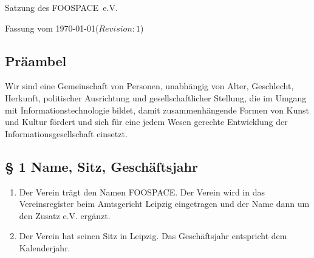 ﻿\documentclass[10pt,a4paper]{scrartcl}
\newcommand{\qs}[1]{\glqq#1\grqq}
\newcommand{\name}{FOOSPACE}
\newcommand{\revision}{$Revision: 1 $}
\begin{document}
{\LARGE Satzung des \name\ e.V.}

Fassung vom \today (\revision)

\subsection*{Präambel}



Wir sind eine Gemeinschaft von Personen, unabhängig von Alter,
Geschlecht, Herkunft, politischer Ausrichtung und gesellschaftlicher
Stellung, die im Umgang mit Informationstechnologie bildet, damit
zusammenhängende Formen von Kunst und Kultur fördert und sich für
eine jedem Wesen gerechte Entwicklung der Informationsgesellschaft
einsetzt.
%
%
\subsection*{§ 1 Name, Sitz, Geschäftsjahr}
\begin{enumerate}
\item Der Verein trägt den Namen \qs{\name}. Der Verein wird in das
Vereinsregister beim Amtsgericht Leipzig eingetragen
und der Name dann um den Zusatz \qs{e.V.} ergänzt.
\item Der Verein hat seinen Sitz in Leipzig. Das Geschäftsjahr entspricht
dem Kalenderjahr.
\end{enumerate}
%
%
\end{document}
